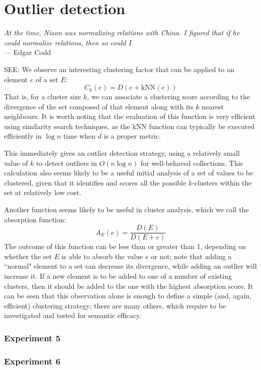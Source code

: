 \chapter{Outlier detection}\label{ch:outlier}
\begin{flushleft}{\slshape    
    At the time, Nixon was normalizing relations with China.  
    I figured that if he could normalize relations, then so could I} \\ \medskip
    --- Edgar Codd
\end{flushleft}
%
SEE:\cite{Davies:1979, Chandola:2009, Brito:1997,  Ramaswamy:2000, Knorr:1998,Knorr:2000,Zhang:2006,Hautamaki:2004,Angiulli:2002,Angiulli:2006,Breunig:2000,Pham:2012,Bay:2003,Kriegel:2008}
%
We observe an interesting clustering factor that can be applied to an element $e$ of a set $E$:
%
\[
C_k(e) = D(e + \text{kNN}(e))
\]
%
That is, for a cluster size $k$, we can associate a clustering score according to the divergence of the set composed of that element along with its $k$ nearest neighbours. It is worth noting that the evaluation of this function is very efficient using similarity search techniques, as the kNN function can typically be executed  efficiently in $\log n$ time when $d$ is a proper metric.

This immediately gives  an outlier detection strategy, using a relatively small value of $k$ to detect outliers in $O(n \log n)$ for well-behaved collections. This calculation also seems  likely to be a useful initial analysis of a set of values to be clustered, given that it identifies and scores all the possible $k$-clusters within the set at relatively low cost.

Another function seems likely to be useful in cluster analysis, which we call the absorption function:
%
\[
A_E(e) = \frac{D(E) }{ D(E + e)}
\]
%
The outcome of this function can be less than or greater than 1, depending on whether the set $E$ is able to absorb the value $e$ or not; note that adding a ``normal" element to a set can decrease its divergence, while adding an outlier will increase it. If  a new element is to be added to one of a number of existing clusters, then it should be added to the one with the highest absorption score. It can be seen that this observation alone is enough to define a simple (and, again, efficient) clustering strategy; there are many others, which require to be investigated and tested for semantic efficacy.
\subsection{Experiment 5}
\subsection{Experiment 6}
%